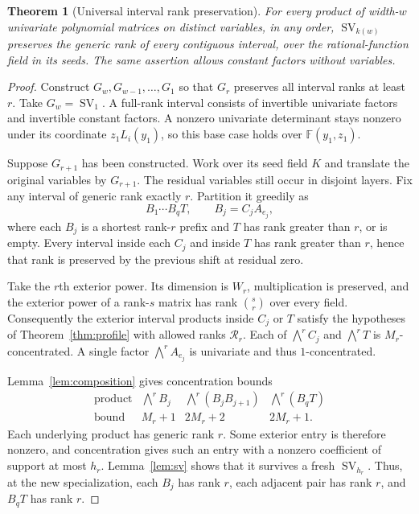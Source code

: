 \documentclass[11pt]{article}
\newtheorem{theorem}{Theorem}[section]
\theoremstyle{definition}\newtheorem{definition}[theorem]{Definition}
\theoremstyle{remark}\newtheorem{remark}[theorem]{Remark}
\newcommand{\F}{\mathbb F}
\newcommand{\SV}{\operatorname{SV}}
\begin{document}
\begin{theorem}[Universal interval rank preservation]\label{thm:preserve}
For every product of width-$w$ univariate polynomial matrices on distinct
variables, in any order, $\SV_{k(w)}$ preserves the generic rank of every
contiguous interval, over the rational-function field in its seeds.
The same assertion allows constant factors without variables.
\end{theorem}
\begin{proof}
Construct $G_w,G_{w-1},\ldots,G_1$ so that $G_r$ preserves all interval ranks
at least $r$. Take $G_w=\SV_1$. A full-rank interval consists of invertible
univariate factors and invertible constant factors. A nonzero univariate
determinant stays nonzero under its coordinate $z_1L_i(y_1)$, so this base
case holds over $\F(y_1,z_1)$.

Suppose $G_{r+1}$ has been constructed. Work over its seed field $K$ and
translate the original variables by $G_{r+1}$. The residual variables
still occur in disjoint layers. Fix any interval of generic rank exactly
$r$. Partition it greedily as
\[
 B_1\cdots B_qT,\qquad B_j=C_jA_{e_j},
\]
where each $B_j$ is a shortest rank-$r$ prefix and $T$ has rank greater
than $r$, or is empty. Every interval inside each $C_j$ and inside $T$
has rank greater than $r$, hence that rank is preserved by the previous
shift at residual zero.

Take the $r$th exterior power. Its dimension is $W_r$, multiplication is
preserved, and the exterior power of a rank-$s$ matrix has rank
$\binom sr$ over every field. Consequently the exterior interval products
inside $C_j$ or $T$ satisfy the hypotheses of
Theorem~\ref{thm:profile} with allowed ranks $\mathcal R_r$. Each of
$\bigwedge^r C_j$ and $\bigwedge^r T$ is $M_r$-concentrated. A single
factor $\bigwedge^r A_{e_j}$ is univariate and thus $1$-concentrated.

Lemma~\ref{lem:composition} gives concentration bounds
\[
\begin{array}{c|ccc}
\text{product}&\bigwedge^r B_j&\bigwedge^r(B_jB_{j+1})&\bigwedge^r(B_qT)\\
\hline
\text{bound}&M_r+1&2M_r+2&2M_r+1.
\end{array}
\]
Each underlying product has generic rank $r$. Some exterior entry is
therefore nonzero, and concentration gives such an entry with a nonzero
coefficient of support at most $h_r$. Lemma~\ref{lem:sv} shows that it
survives a fresh $\SV_{h_r}$. Thus, at the new specialization, each $B_j$
has rank $r$, each adjacent pair has rank $r$, and $B_qT$ has rank $r$.


\end{proof}
\end{document}
